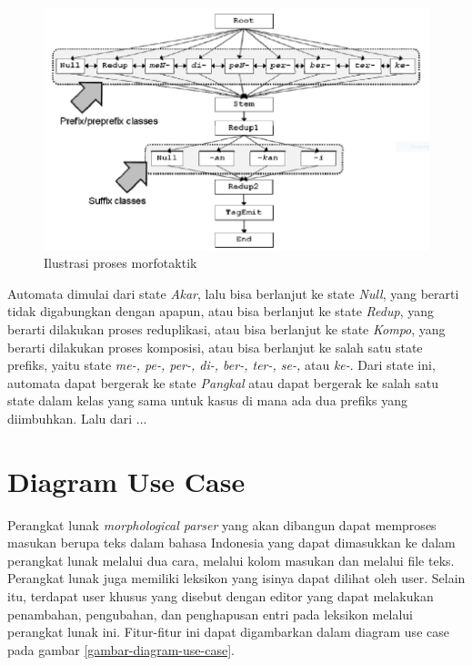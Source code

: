 \begin{figure}[H]
\centering
\includegraphics[scale=0.5]{Gambar/gambar-fsa-morfotaktik}
\caption[Ilustrasi proses morfotaktik]{Ilustrasi proses morfotaktik} 
\label{gambar-fsa-morfotaktik}
\end{figure}

Automata dimulai dari state \textit{Akar}, lalu bisa berlanjut ke state \textit{Null}, yang berarti tidak digabungkan dengan apapun, atau bisa berlanjut ke state \textit{Redup}, yang berarti dilakukan proses reduplikasi, atau bisa berlanjut ke state \textit{Kompo}, yang berarti dilakukan proses komposisi, atau bisa berlanjut ke salah satu state prefiks, yaitu state \textit{me-, pe-, per-, di-, ber-, ter-, se-,} atau \textit{ke-}. Dari state ini, automata dapat bergerak ke state \textit{Pangkal} atau dapat bergerak ke salah satu state dalam kelas yang sama untuk kasus di mana ada dua prefiks yang diimbuhkan. Lalu dari ...


\section{Diagram Use Case}
\label{sec:DiagramUseCase}

Perangkat lunak \textit{morphological parser} yang akan dibangun dapat memproses masukan berupa teks dalam bahasa Indonesia yang dapat dimasukkan ke dalam perangkat lunak melalui dua cara, melalui kolom masukan dan melalui file teks. Perangkat lunak juga memiliki leksikon yang isinya dapat dilihat oleh user. Selain itu, terdapat user khusus yang disebut dengan editor yang dapat melakukan penambahan, pengubahan, dan penghapusan entri pada leksikon melalui perangkat lunak ini. Fitur-fitur ini dapat digambarkan dalam diagram use case pada gambar \ref{gambar-diagram-use-case}.
		
